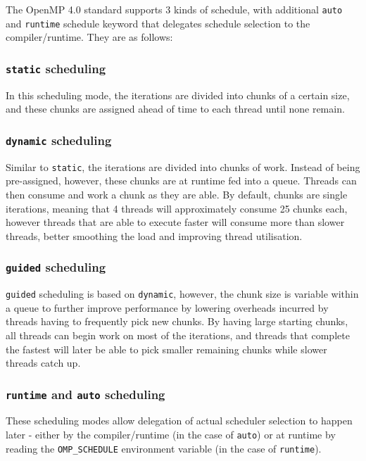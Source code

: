 \documentclass[a4paper]{article}
\begin{document}
        The OpenMP 4.0 standard \cite{OpenMP40Std} supports 3 kinds of schedule, with additional \texttt{auto} and
        \texttt{runtime} schedule keyword that delegates schedule selection to the compiler/runtime. They are as
        follows:

            \subsubsection{\texttt{static} scheduling}
            In this scheduling mode, the iterations are divided into chunks of a certain size, and these chunks are
            assigned ahead of time to each thread until none remain.

            \subsubsection{\texttt{dynamic} scheduling}
            Similar to \texttt{static}, the iterations are divided into chunks of work. Instead of being pre-assigned,
            however, these chunks are at runtime fed into a queue. Threads can then consume and work a chunk as they
            are able. By default, chunks are single iterations, meaning that 4 threads will approximately consume 25
            chunks each, however threads that are able to execute faster will consume more than slower threads,
            better smoothing the load and improving thread utilisation.

            \subsubsection{\texttt{guided} scheduling}
            \texttt{guided} scheduling is based on \texttt{dynamic}, however, the chunk size is variable within a queue
            to further improve performance by lowering overheads incurred by threads having to frequently pick new
            chunks. By having large starting chunks, all threads can begin work on most of the iterations, and threads
            that complete the fastest will later be able to pick smaller remaining chunks while slower threads catch
            up.

            \subsubsection{\texttt{runtime} and \texttt{auto} scheduling}
            These scheduling modes allow delegation of actual scheduler selection to happen later - either by the
            compiler/runtime (in the case of \texttt{auto}) or at runtime by reading the \texttt{OMP\_SCHEDULE} 
            environment variable (in the case of \texttt{runtime}).
\end{document}
